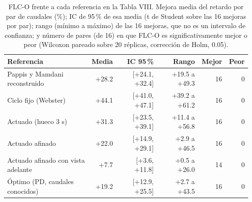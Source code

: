 \begin{table}[t]
\centering
\caption{FLC-O frente a cada referencia en la Tabla VIII. Mejora media del retardo por par de caudales (\%); IC de 95\,\% de esa media (t de Student sobre las 16 mejoras por par); rango (m\'inimo a m\'aximo) de las 16 mejoras, que no es un intervalo de confianza; y n\'umero de pares (de 16) en que FLC-O es significativamente mejor o peor (Wilcoxon pareado sobre 20 r\'eplicas, correcci\'on de Holm, 0.05).}
\label{tab:comparaciones}
\scriptsize
\setlength{\tabcolsep}{2.6pt}
\begin{tabular}{@{}lrrrrr@{}}
\toprule
Referencia & Media & IC 95\,\% & Rango & Mejor & Peor \\
\midrule
Pappis y Mamdani reconstruido & +28.2 & [+24.1, +32.4] & +19.5 a +49.3 & 16 & 0 \\
Ciclo fijo (Webster) & +44.1 & [+41.0, +47.1] & +39.2 a +61.2 & 16 & 0 \\
Actuado (hueco 3 s) & +31.3 & [+23.5, +39.1] & +11.4 a +56.8 & 16 & 0 \\
Actuado afinado & +22.0 & [+14.9, +29.1] & +2.9 a +46.5 & 16 & 0 \\
Actuado afinado con vista adelante & +7.7 & [+3.6, +11.8] & +0.5 a +26.0 & 14 & 0 \\
Óptimo (PD, caudales conocidos) & +19.2 & [+12.9, +25.5] & +2.7 a +43.5 & 16 & 0 \\
\bottomrule
\end{tabular}
\end{table}
